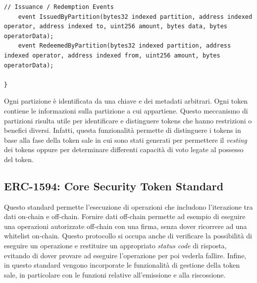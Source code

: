 \begin{lstlisting}[language=Solidity,numbers=none]
    // Issuance / Redemption Events
    event IssuedByPartition(bytes32 indexed partition, address indexed operator, address indexed to, uint256 amount, bytes data, bytes operatorData);
    event RedeemedByPartition(bytes32 indexed partition, address indexed operator, address indexed from, uint256 amount, bytes operatorData);

}
\end{lstlisting}

Ogni partizione è identificata da una chiave e dei metadati arbitrari. Ogni token contiene le informazioni sulla partizione a cui appartiene. 
Questo meccanismo di partizioni risulta utile per identificare e distinguere tokens che hanno restrizioni o benefici diversi. Infatti, questa funzionalità permette di distinguere i tokens in base alla fase della token sale in cui sono stati generati per permettere il \textit{vesting} dei tokens oppure per determinare differenti capacità di voto legate al possesso del token. 

\subsection{ERC-1594: Core Security Token Standard}
Questo standard permette l'esecuzione di operazioni che includono l'iterazione tra dati on-chain e off-chain. Fornire dati off-chain permette ad esempio di eseguire una operazioni autorizzate off-chain con una firma, senza dover ricorrere ad una whitelist on-chain. Questo protocollo si occupa anche di verificare la possibilità di eseguire un operazione e restituire un appropriato \textit{status code} di risposta, evitando di dover provare ad eseguire l'operazione per poi vederla fallire. 
Infine, in questo standard vengono incorporate le funzionalità di gestione della token sale, in particolare con le funzioni relative all'emissione e alla riscossione. 

